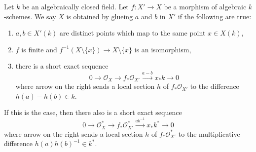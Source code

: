 \begin{example}
\label{example-glue-points}
Let $k$ be an algebraically closed field. Let $f : X' \to X$
be a morphism of algebraic $k$-schemes. We say $X$ is
obtained by glueing $a$ and $b$ in $X'$ if the following are true:
\begin{enumerate}
\item $a, b \in X'(k)$ are distinct points which map to the same
point $x \in X(k)$,
\item $f$ is finite and
$f^{-1}(X \setminus \{x\}) \to X \setminus \{x\}$ is an isomorphism,
\item there is a short exact sequence
$$
0 \to \mathcal{O}_X \to f_*\mathcal{O}_{X'} \xrightarrow{a - b} x_*k \to 0
$$
where arrow on the right sends a local section $h$ of $f_*\mathcal{O}_{X'}$
to the difference $h(a) - h(b) \in k$.
\end{enumerate}
If this is the case, then there also is a short exact sequence
$$
0 \to \mathcal{O}_X^* \to f_*\mathcal{O}_{X'}^*
\xrightarrow{ab^{-1}} x_*k^* \to 0
$$
where arrow on the right sends a local section $h$ of $f_*\mathcal{O}_{X'}^*$
to the multiplicative difference $h(a)h(b)^{-1} \in k^*$.
\end{example}